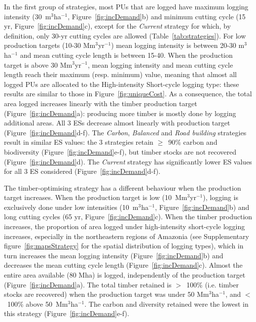 \documentclass{article}
\begin{document}
In the first group of strategies, most PUs that are logged have maximum logging intensity (30~m$^3$ha$^{-1}$, Figure~\ref{fig:incDemand}b) and minimum cutting cycle (15 yr, Figure~\ref{fig:incDemand}c), except for the \textit{Current} strategy for which, by definition, only 30-yr cutting cycles are allowed (Table~\ref{tab:strategies}). For low production targets (10-30 Mm$^3$yr$^{-1}$) mean logging intensity is between 20-30 m$^3$ha$^{-1}$ and mean cutting cycle length is between 15-40. When the production target is above 30 Mm$^3$yr$^{-1}$, mean logging intensity and mean cutting cycle length reach their maximum (resp. minimum) value, meaning that almost all logged PUs are allocated to the High-intensity Short-cycle logging type: these results are similar to those in Figure~\ref{fig:uniqueCost}. As a consequence, the total area logged increases linearly with the timber production target (Figure~\ref{fig:incDemand}a): producing more timber is mostly done by logging additional areas. All 3 ESs decrease almost linearly with production target (Figure~\ref{fig:incDemand}d-f). The \textit{Carbon}, \textit{Balanced} and \textit{Road building} strategies result in similar ES values: the 3 strategies retain $\geq$~90\% carbon and biodiversity (Figure~\ref{fig:incDemand}e-f), but timber stocks are not recovered  (Figure~\ref{fig:incDemand}d). The \textit{Current} strategy has significantly lower ES values for all 3 ES considered (Figure~\ref{fig:incDemand}d-f).

The timber-optimising strategy has a different behaviour when the production target increases. When the production target is low (10~Mm$^3$yr$^{-1}$), logging is exclusively done under low intensities (10~m$^3$ha$^{-1}$, Figure~\ref{fig:incDemand}b) and long cutting cycles (65 yr, Figure~\ref{fig:incDemand}c). When the timber production increases, the proportion of area logged under high-intensity short-cycle logging increases, especially in the northeastern regions of Amazonia (see Supplementary figure~\ref{fig:mapsStrategy} for the spatial distribution of logging types), which in turn increases the mean logging intensity (Figure~\ref{fig:incDemand}b) and decreases the mean cutting cycle length (Figure~\ref{fig:incDemand}c). Almost the entire area available (80 Mha) is logged, independently of the production target (Figure~\ref{fig:incDemand}a). The total timber retained is $>$~100\% (i.e. timber stocks are recovered) when the production target was under 50 Mm$^3$ha$^{-1}$, and $<$~100\% above 50~Mm$^3$ha$^{-1}$. The carbon and diversity retained were the lowest in this strategy (Figure~\ref{fig:incDemand}e-f).  
\end{document}
